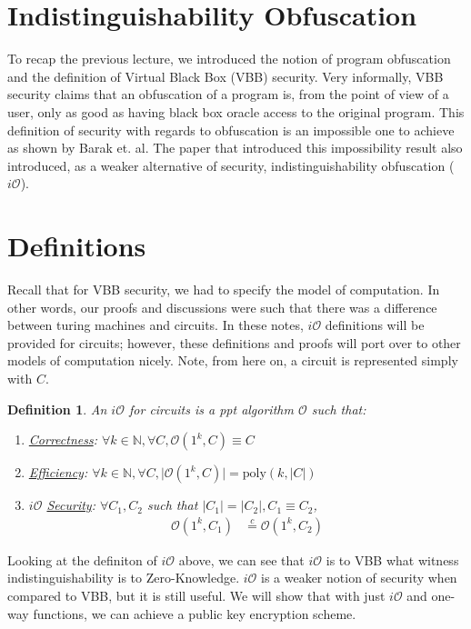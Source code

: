 \documentclass{article}
\newtheorem{definition}[corollary]{Definition}
\newcommand{\ci}{\stackrel{c}{=}}
\newcommand{\io}{i\mathcal{O}}
\begin{document}
\section{Indistinguishability Obfuscation}

To recap the previous lecture, we introduced the notion of program obfuscation and the definition of Virtual Black Box (VBB) security. Very informally, VBB security claims that an obfuscation of a program is, from the point of view of a user, only as good as having black box oracle access to the original program. This definition of security with regards to obfuscation is an impossible one to achieve as shown by Barak et. al. The paper that introduced this impossibility result also introduced, as a weaker alternative of security, indistinguishability obfuscation ($\io$).

\section{Definitions}
Recall that for VBB security, we had to specify the model of computation. In other words, our proofs and discussions were such that there was a difference between turing machines and circuits. In these notes, $\io$ definitions will be provided for circuits; however, these definitions and proofs will port over to other models of computation nicely. Note, from here on, a circuit is represented simply with $C$.
\begin{definition}
    An $\io$ for circuits is a ppt algorithm $\mathcal{O}$ such that:
        \begin{enumerate}
            \item \underline{Correctness}: $\forall{k}\in\mathbb{N}, \forall{C}, \mathcal{O}(1^k, C) \equiv C$
            \item \underline{Efficiency}: $\forall{k}\in\mathbb{N}, \forall{C}, \lvert \mathcal{O}(1^k, C) \rvert = \text{poly}(k, \lvert C \rvert)$
            \item $\io$ \underline{Security}: $\forall{C_1,C_2}$ such that $\lvert C_1 \rvert = \lvert C_2 \rvert, C_1 \equiv C_2$,
                \begin{align*}
                    \mathcal{O}(1^k, C_1) & \ci \mathcal{O}(1^k, C_2)
                \end{align*}
        \end{enumerate}
\end{definition}
\noindent
Looking at the definiton of $\io$ above, we can see that $\io$ is to VBB what witness indistinguishability is to Zero-Knowledge. $\io$ is a weaker notion of security when compared to VBB, but it is still useful. We will show that with just $\io$ and one-way functions, we can achieve a public key encryption scheme.
\end{document}
